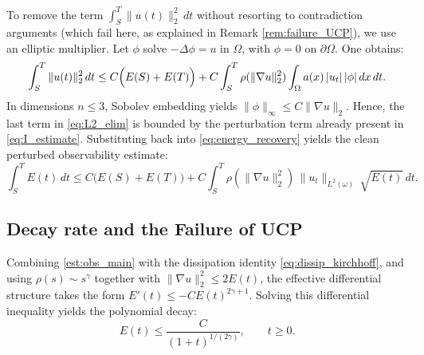 \documentclass[11pt,reqno]{amsart}
\theoremstyle{remark}
\begin{document}
To remove the term $\int_S^T\|u(t)\|_2^2\,dt$ without resorting to contradiction arguments (which fail here, as explained in Remark \ref{rem:failure_UCP}), we use an elliptic multiplier. Let $\phi$ solve $-\Delta\phi=u$ in $\Omega$, with $\phi=0$ on $\partial\Omega$. One obtains:
\begin{equation}\label{eq:L2_elim}
\int_S^T\|u(t)\|_2^2\,dt
\le C\Bigl(E(S)+E(T)\Bigr)
 + C\int_S^T \rho(\|\nabla u\|_2^2)\int_\Omega a(x)\,|u_t|\,|\phi|\,dx\,dt.
\end{equation}
In dimensions $n\le3$, Sobolev embedding yields $\|\phi\|_\infty\le C\|\nabla u\|_2$. Hence, the last term in \eqref{eq:L2_elim} is bounded by the perturbation term already present in \eqref{eq:I_estimate}. Substituting back into \eqref{eq:energy_recovery} yields the clean perturbed observability estimate:
\begin{equation}\label{est:obs_main}
\int_S^T E(t)\,dt
\le C\bigl(E(S)+E(T)\bigr)
 + C\int_S^T \rho(\|\nabla u\|_2^2)\,\|u_t\|_{L^2(\omega)}\,\sqrt{E(t)}\,dt.
\end{equation}

\subsection{Decay rate and the Failure of UCP}

Combining \eqref{est:obs_main} with the dissipation identity \eqref{eq:dissip_kirchhoff}, and using $\rho(s) \sim s^\gamma$ together with $\|\nabla u\|_2^2\le 2E(t)$, the effective differential structure takes the form $E'(t) \le -C E(t)^{2\gamma+1}$. Solving this differential inequality yields the polynomial decay:
\begin{equation}\label{eq:kirchhoff_decay}
E(t)\le \frac{C}{(1+t)^{1/(2\gamma)}},\qquad t\ge0.
\end{equation}
\end{document}
